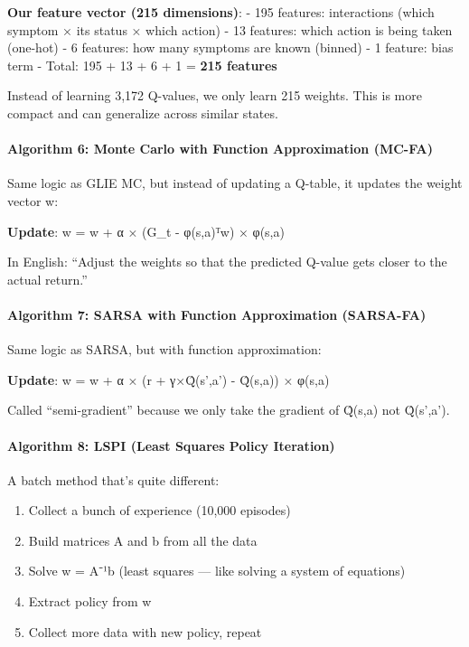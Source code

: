 \documentclass[
]{article}
\providecommand{\tightlist}{%
  \setlength{\itemsep}{0pt}\setlength{\parskip}{0pt}}
\begin{document}
\textbf{Our feature vector (215 dimensions)}: - 195 features:
interactions (which symptom × its status × which action) - 13 features:
which action is being taken (one-hot) - 6 features: how many symptoms
are known (binned) - 1 feature: bias term - Total: 195 + 13 + 6 + 1 =
\textbf{215 features}

Instead of learning 3,172 Q-values, we only learn 215 weights. This is
more compact and can generalize across similar states.

\hypertarget{algorithm-6-monte-carlo-with-function-approximation-mc-fa}{%
\paragraph{Algorithm 6: Monte Carlo with Function Approximation
(MC-FA)}\label{algorithm-6-monte-carlo-with-function-approximation-mc-fa}}

Same logic as GLIE MC, but instead of updating a Q-table, it updates the
weight vector w:

\textbf{Update}: w = w + α × (G\_t - φ(s,a)ᵀw) × φ(s,a)

In English: ``Adjust the weights so that the predicted Q-value gets
closer to the actual return.''

\hypertarget{algorithm-7-sarsa-with-function-approximation-sarsa-fa}{%
\paragraph{Algorithm 7: SARSA with Function Approximation
(SARSA-FA)}\label{algorithm-7-sarsa-with-function-approximation-sarsa-fa}}

Same logic as SARSA, but with function approximation:

\textbf{Update}: w = w + α × (r + γ×Q̂(s',a') - Q̂(s,a)) × φ(s,a)

Called ``semi-gradient'' because we only take the gradient of Q̂(s,a) not
Q̂(s',a').

\hypertarget{algorithm-8-lspi-least-squares-policy-iteration}{%
\paragraph{Algorithm 8: LSPI (Least Squares Policy
Iteration)}\label{algorithm-8-lspi-least-squares-policy-iteration}}

A batch method that's quite different:

\begin{enumerate}
\def\labelenumi{\arabic{enumi}.}
\tightlist
\item
  Collect a bunch of experience (10,000 episodes)
\item
  Build matrices A and b from all the data
\item
  Solve w = A⁻¹b (least squares --- like solving a system of equations)
\item
  Extract policy from w
\item
  Collect more data with new policy, repeat
\end{enumerate}
\end{document}
